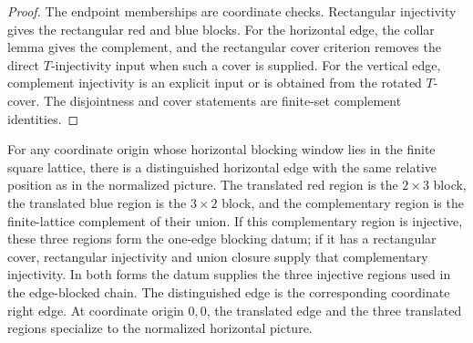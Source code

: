 \begin{proof}\leanok
    The endpoint memberships are coordinate checks. Rectangular injectivity
    gives the rectangular red and blue blocks. For the horizontal edge, the
    collar lemma gives the complement, and the rectangular cover criterion
    removes the direct $T$-injectivity input when such a cover is supplied.
    For the vertical edge, complement injectivity is an explicit input or is
    obtained from the rotated $T$-cover. The disjointness and cover
    statements are finite-set complement identities.
\end{proof}

\begin{lemma}%
    \label{lem:peps_normalSquareHorizontalTranslatedEdge_blockingData}
    \leanok
    For any coordinate origin whose horizontal blocking window lies in the
    finite square lattice, there is a distinguished horizontal edge with the
    same relative position as in the normalized picture. The translated red
    region is the $2\times3$ block, the translated blue region is the
    $3\times2$ block, and the complementary region is the finite-lattice
    complement of their union. If this complementary region is injective,
    these three regions form the one-edge blocking datum; if it has a
    rectangular cover, rectangular injectivity and union closure supply that
    complementary injectivity. In both forms the datum supplies the three
    injective regions used in the edge-blocked chain. The distinguished edge
    is the corresponding coordinate right edge. At coordinate origin $0,0$,
    the translated edge and the three translated regions specialize to the
    normalized horizontal picture.
\end{lemma}
